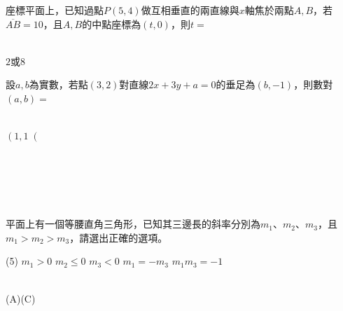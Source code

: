 \documentclass
[answers]
{exam}
\newcommand\ul[1]{\uline{\hspace*{#1}}}
\theoremstyle{definition}
\begin{document}
\begin{questions}
\question

座標平面上，已知過點$P\left( 5,4\right)$做互相垂直的兩直線與$x$軸焦於兩點$A,B$，若$\overline{AB}=10$，且$A,B$的中點座標為$\left( t,0 \right)$，則$t=$\ul{50pt}
\\ 
\begin{solution}~\\
	$2$或$8$
\end{solution}

\question

設$a,b$為實數，若點$\left( 3,2\right)$對直線$2x+3y+a=0$的垂足為$\left( b,-1 \right)$，則數對$\left( a,b\right) = $\ul{50pt}
\\ 
\begin{solution}~\\
	$\left( 1,1 \right($
\end{solution}
$ $\\$ $\\$ $\\$ $\\
\question

平面上有一個等腰直角三角形，已知其三邊長的斜率分別為$m_1$、$m_2$、$m_3$，且$m_1>m_2>m_3$，請選出正確的選項。

\begin{tasks}(5)
	\task $m_1 > 0$
	\task $m_2 \leq 0$
	\task $m_3 < 0$
	\task $m_1 = -m_3$
	\task $m_1m_3=-1$
\end{tasks}
\begin{solution}~\\
	(A)(C)
\end{solution}

\end{questions}
\end{document}
